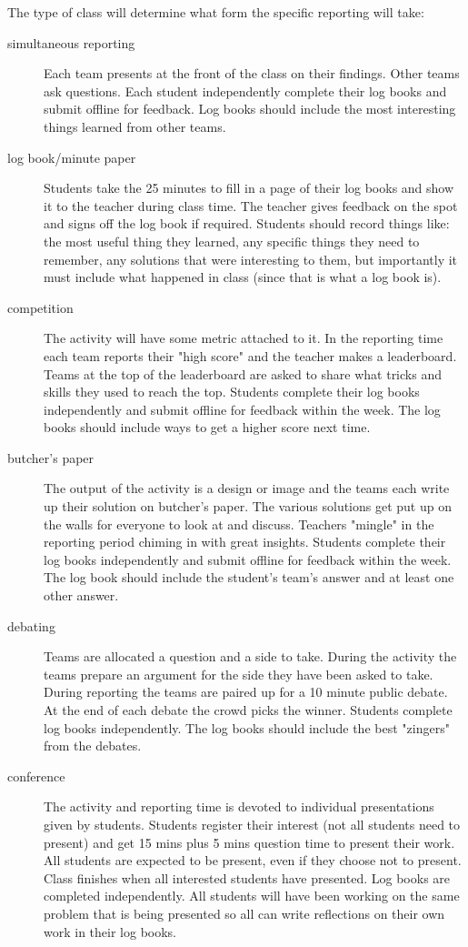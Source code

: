 \documentclass[twoside=false,DIV=14]{scrartcl}
\begin{document}
\noindent The type of class will determine what form the specific reporting will take:

\begin{description}
\item [simultaneous reporting]  Each team presents at the front of the class on their findings.  Other teams ask questions.  Each student independently complete their log books and submit offline for feedback.  Log books should include the most interesting things learned from other teams.
\item [log book/minute paper] Students take the 25 minutes to fill in a page of their log books and show it to the teacher during class time.  The teacher gives feedback on the spot and signs off the log book if required.  Students should record things like: the most useful thing they learned, any specific things they need to remember, any solutions that were interesting to them, but importantly it must include what happened in class (since that is what a log book is).
\item[competition] The activity will have some metric attached to it.  In the reporting time each team reports their "high score" and the teacher makes a leaderboard.  Teams at the top of the leaderboard are asked to share what tricks and skills they used to reach the top.  Students complete their log books independently and submit offline for feedback within the week.  The log books should include ways to get a higher score next time.
\item[butcher's paper] The output of the activity is a design or image and the teams each write up their solution on butcher's paper.  The various solutions get put up on the walls for everyone to look at and discuss.  Teachers "mingle" in the reporting period chiming in with great insights.  Students complete their log books independently and submit offline for feedback within the week. The log book should include the student's team's answer and at least one other answer.
\item[debating] Teams are allocated a question and a side to take.  During the activity the teams prepare an argument for the side they have been asked to take.  During reporting the teams are paired up for a 10 minute public debate.  At the end of each debate the crowd picks the winner.  Students complete log books independently.  The log books should include the best "zingers" from the debates.
\item[conference] The activity and reporting time is devoted to individual presentations given by students.  Students register their interest (not all students need to present) and get 15 mins plus 5 mins question time to present their work.  All students are expected to be present, even if they choose not to present.  Class finishes when all interested students have presented.  Log books are completed independently.  All students will have been working on the same problem that is being presented so all can write reflections on their own work in their log books.
\end{description}
\end{document}
